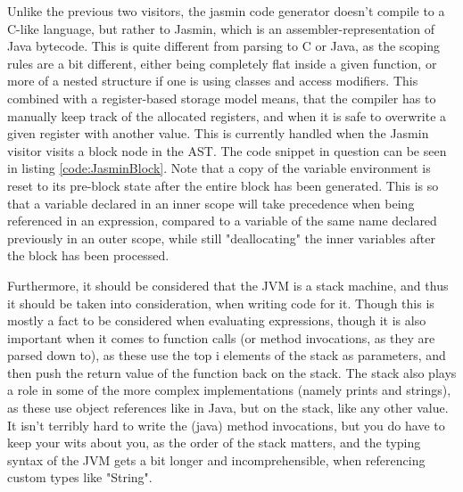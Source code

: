Unlike the previous two visitors, the jasmin code generator doesn't compile to a C-like language, but rather to Jasmin, which is an assembler-representation of Java bytecode. This is quite different from parsing to C or Java, as the scoping rules are a bit different, either being completely flat inside a given function, or more of a nested structure if one is using classes and access modifiers. This combined with a register-based storage model means, that the compiler has to manually keep track of the allocated registers, and when it is safe to overwrite a given register with another value. This is currently handled when the Jasmin visitor visits a block node in the AST. The code snippet in question can be seen in listing \ref{code:JasminBlock}. Note that a copy of the variable environment is reset to its pre-block state after the entire block has been generated. This is so that a variable declared in an inner scope will take precedence when being referenced in an expression, compared to a variable of the same name declared previously in an outer scope, while still "deallocating" the inner variables after the block has been processed.


Furthermore, it should be considered that the JVM is a stack machine, and thus it should be taken into consideration, when writing code for it. Though this is mostly a fact to be considered when evaluating expressions, though it is also important when it comes to function calls (or method invocations, as they are parsed down to), as these use the top i elements of the stack as parameters, and then push the return value of the function back on the stack. The stack also plays a role in some of the more complex implementations (namely prints and strings), as these use object references like in Java, but on the stack, like any other value. It isn't terribly hard to write the (java) method invocations, but you do have to keep your wits about you, as the order of the stack matters, and the typing syntax of the JVM gets a bit longer and incomprehensible, when referencing custom types like "String".
